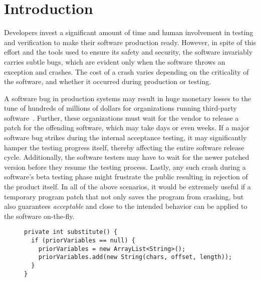 \section{Introduction}
\label{sec:intro}


Developers invest a significant amount of time and human involvement in testing
and verification to make their software production ready. However, in spite of
this effort and the tools used to ensure its safety and security, the software
invariably carries subtle bugs, which are evident only when the software
throws an exception and crashes. The cost of a 
crash varies depending on the criticality of the software, and
whether it occurred during production or testing.

A software bug in production systems may result in huge monetary losses to the
tune of hundreds of millions of dollars for organizations running third-party
software~\cite{hp, amazon, hershey, nike}. Further, these organizations must
wait for the vendor to release a patch for the offending software, which may
take days or even weeks. If a major software bug strikes during the internal 
acceptance testing, it may significantly hamper the testing progress itself,
thereby affecting the entire software release cycle.
Additionally, the software testers may have to wait for the
newer patched version before they resume the testing process. Lastly, any such
crash during a software's beta testing phase might frustrate the public
resulting in rejection of the product itself. In all of the above scenarios, it
would be extremely useful if a temporary program patch that not only saves the
program from crashing, but also guarantees \textit{acceptable} and
close to the intended behavior can be applied to the software on-the-fly.


\lstset{language=Java , caption=Apache Log4j bug example.,
label=snippet:exampleRepairing1}
\begin{figure}[t]
\begin{lstlisting}
private int substitute() {
  if (priorVariables == null) {
    priorVariables = new ArrayList<String>();
    priorVariables.add(new String(chars, offset, length));
  }
}
\end{lstlisting}
\end{figure}

